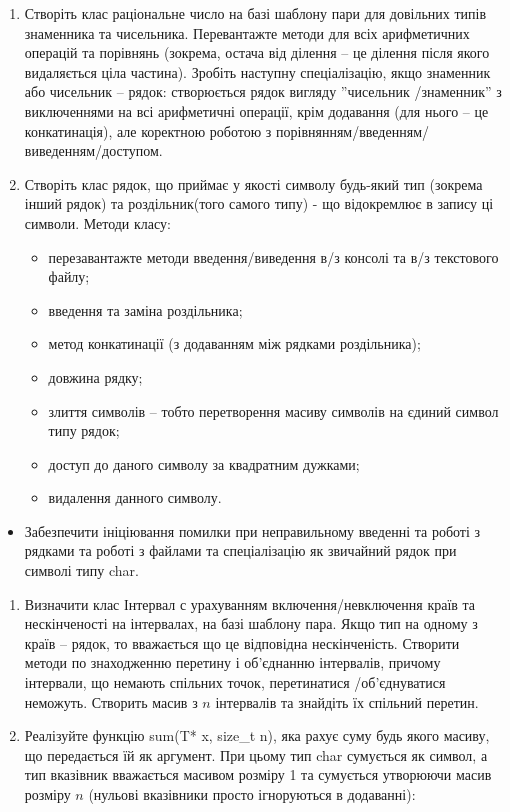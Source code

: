 \documentclass[]{article}
\begin{document}
\begin{enumerate}
\def\labelenumi{\arabic{enumi}.}
\item
  Створіть клас раціональне число на базі шаблону пари для довільних
  типів знаменника та чисельника. Перевантажте методи для всіх
  арифметичних операцій та порівнянь (зокрема, остача від ділення -- це
  ділення після якого видаляється ціла частина). Зробіть наступну
  спеціалізацію, якщо знаменник або чисельник -- рядок: створюється
  рядок вигляду ''чисельник /знаменник'' з виключеннями на всі
  арифметичні операції, крім додавання (для нього -- це конкатинація),
  але коректною роботою з порівнянням/введенням/виведенням/доступом.
\item
  Створіть клас рядок, що приймає у якості символу будь-який тип
  (зокрема інший рядок) та роздільник(того самого типу) - що відокремлює
  в запису ці символи. Методи класу:

  \begin{itemize}
  \item
    перезавантажте методи введення/виведення в/з консолі та в/з
    текстового файлу;
  \item
    введення та заміна роздільника;
  \item
    метод конкатинації (з додаванням між рядками роздільника);
  \item
    довжина рядку;
  \item
    злиття символів -- тобто перетворення масиву символів на єдиний
    символ типу рядок;
  \item
    доступ до даного символу за квадратним дужками;
  \item
    видалення данного символу.
  \end{itemize}
\end{enumerate}

\begin{itemize}
\item
  Забезпечити ініціювання помилки при неправильному введенні та роботі з
  рядками та роботі з файлами та спеціалізацію як звичайний рядок при
  символі типу char.
\end{itemize}

\begin{enumerate}
\def\labelenumi{\arabic{enumi}.}
\item
  Визначити клас Інтервал с урахуванням включення/невключення країв та
  нескінченості на інтервалах, на базі шаблону пара. Якщо тип на одному
  з країв -- рядок, то вважається що це відповідна нескінченість.
  Створити методи по знаходженню перетину і об'єднанню інтервалів,
  причому інтервали, що немають спільних точок, перетинатися
  /об'єднуватися неможуть. Створить масив з \(n\) інтервалів та знайдіть
  їх спільний перетин.
\item
  Реалізуйте функцію sum(T* x, size\_t n), яка рахує суму будь якого
  масиву, що передається їй як аргумент. При цьому тип char сумується як
  символ, а тип вказівник вважається масивом розміру 1 та сумується
  утворюючи масив розміру \(n\) (нульові вказівники просто ігноруються в
  додаванні):
\end{enumerate}
\end{document}
